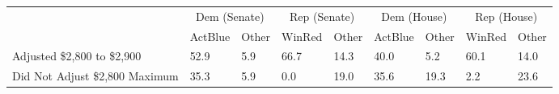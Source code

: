 \begin{tabular}{lll|ll|ll|ll}
  & \multicolumn{2}{c}{Dem (Senate)}& \multicolumn{2}{c}{Rep (Senate)}& \multicolumn{2}{c}{Dem (House)}& \multicolumn{2}{c}{Rep (House)}\\  & ActBlue & Other & WinRed & Other & ActBlue & Other & WinRed & Other \\ 
  \midrule
Adjusted \$2,800 to \$2,900 & 52.9 & 5.9 & 66.7 & 14.3 & 40.0 & 5.2 & 60.1 & 14.0 \\ 
  Did Not Adjust \$2,800 Maximum & 35.3 & 5.9 & 0.0 & 19.0 & 35.6 & 19.3 & 2.2 & 23.6 \\ 
  \end{tabular}
